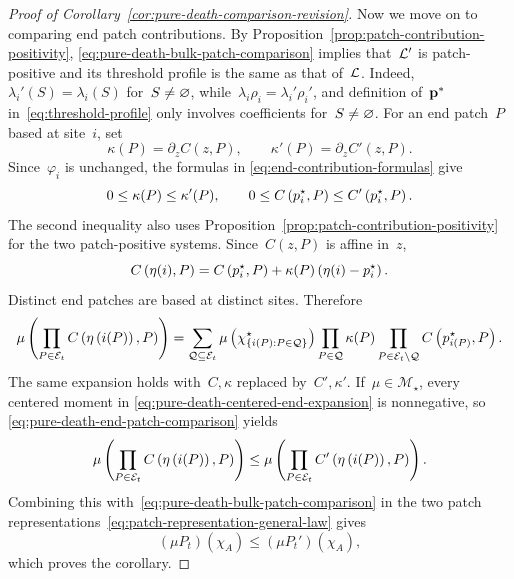 \documentclass[EJP,preprint,NODS,nobera]{ejpecp}
\begin{document}
\begin{proof}[Proof of Corollary~\ref{cor:pure-death-comparison-revision}]
Now we move on to comparing end patch contributions. By Proposition~\ref{prop:patch-contribution-positivity},
\eqref{eq:pure-death-bulk-patch-comparison} implies that~$\mathcal{L}'$ is
patch-positive and its threshold profile is the same as that of~$\mathcal{L}$. Indeed,~$\lambda_i'(S) = \lambda_i(S)$ for~$S\neq \varnothing$, while~$\lambda_i\rho_i=\lambda_i'\rho_i'$,
and definition of~$\mathbf{p}^*$ in~\eqref{eq:threshold-profile} only involves coefficients for~$S\neq \varnothing$. For an end patch~$P$ based at
site~$i$, set
\begin{equation*}
\kappa(P)=\partial_zC(z,P),
\qquad
\kappa'(P)=\partial_zC'(z,P).
\end{equation*}
Since~$\varphi_i$ is unchanged, the formulas in
\eqref{eq:end-contribution-formulas} give
\begin{equation}
\label{eq:pure-death-end-patch-comparison}
0\leq\kappa(P)\leq\kappa'(P),
\qquad
0\leq C\left(p_i^\star,P\right)
\leq
C'\left(p_i^\star,P\right).
\end{equation}
The second inequality also uses Proposition~\ref{prop:patch-contribution-positivity}
for the two patch-positive systems. Since~$C(z,P)$ is affine in~$z$,
\begin{equation*}
C\left(\eta(i),P\right)
=
C\left(p_i^\star,P\right)
+
\kappa(P)\left(\eta(i)-p_i^\star\right).
\end{equation*}
Distinct end patches are based at distinct sites. Therefore
\begin{equation}
\mu\left(
\prod_{P\in\mathcal E_t}
C\left(\eta\left(i(P)\right),P\right)
\right) =
\sum_{\mathcal Q\subseteq\mathcal E_t}
\mu\left(
\chi_{\left\{i(P):P\in\mathcal Q\right\}}^\star
\right)
\prod_{P\in\mathcal Q}\kappa(P)
\prod_{P\in\mathcal E_t\setminus\mathcal Q}
C\left(p_{i(P)}^\star,P\right).
\label{eq:pure-death-centered-end-expansion}
\end{equation}
The same expansion holds with~$C,\kappa$ replaced by~$C',\kappa'$. If~$\mu\in\mathcal M_\star$, every centered moment in
\eqref{eq:pure-death-centered-end-expansion} is nonnegative, so
\eqref{eq:pure-death-end-patch-comparison} yields
\begin{equation*}
\mu\left(
\prod_{P\in\mathcal E_t}
C\left(\eta\left(i(P)\right),P\right)
\right)
\leq
\mu\left(
\prod_{P\in\mathcal E_t}
C'\left(\eta\left(i(P)\right),P\right)
\right).
\end{equation*}
Combining this with~\eqref{eq:pure-death-bulk-patch-comparison} in the two
patch representations~\eqref{eq:patch-representation-general-law} gives
\begin{equation*}
(\mu P_t)(\chi_A)
\leq
(\mu P_t')(\chi_A),
\end{equation*}
which proves the corollary.
\end{proof}
\end{document}
